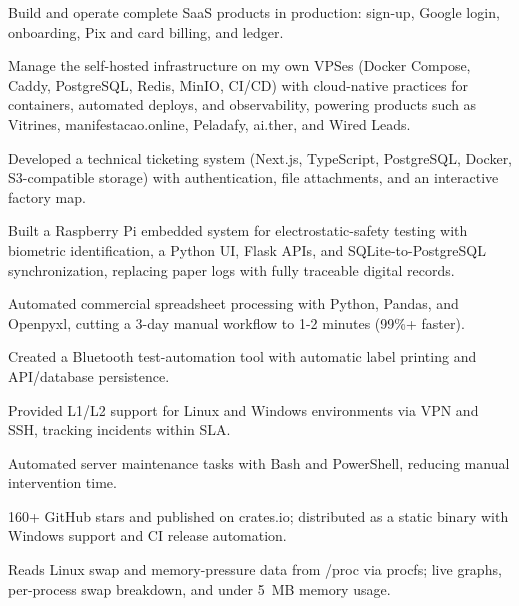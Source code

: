 \begin{cvbullets}
  \item Build and operate complete SaaS products in production: sign-up, Google login, onboarding, Pix and card billing, and ledger.
  \item Manage the self-hosted infrastructure on my own VPSes (Docker Compose, Caddy, PostgreSQL, Redis, MinIO, CI/CD) with cloud-native practices for containers, automated deploys, and observability, powering products such as Vitrines, manifestacao.online, Peladafy, ai.ther, and Wired Leads.
\end{cvbullets}

\begin{cvbullets}
  \item Developed a technical ticketing system (Next.js, TypeScript, PostgreSQL, Docker, S3-compatible storage) with authentication, file attachments, and an interactive factory map.
  \item Built a Raspberry Pi embedded system for electrostatic-safety testing with biometric identification, a Python UI, Flask APIs, and SQLite-to-PostgreSQL synchronization, replacing paper logs with fully traceable digital records.
  \item Automated commercial spreadsheet processing with Python, Pandas, and Openpyxl, cutting a 3-day manual workflow to 1-2 minutes (99\%+ faster).
  \item Created a Bluetooth test-automation tool with automatic label printing and API/database persistence.
\end{cvbullets}

\begin{cvbullets}
  \item Provided L1/L2 support for Linux and Windows environments via VPN and SSH, tracking incidents within SLA.
  \item Automated server maintenance tasks with Bash and PowerShell, reducing manual intervention time.
\end{cvbullets}


\begin{cvbullets}
  \item 160+ GitHub stars and published on crates.io; distributed as a static binary with Windows support and CI release automation.
  \item Reads Linux swap and memory-pressure data from /proc via procfs; live graphs, per-process swap breakdown, and under 5~MB memory usage.
\end{cvbullets}

